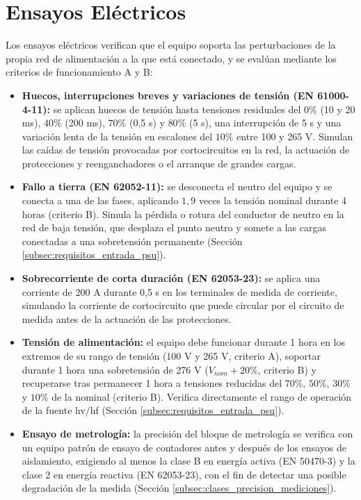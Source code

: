 \section{Ensayos Eléctricos}
\label{sec:ensayos_electricos}

Los ensayos eléctricos verifican que el equipo soporta las perturbaciones de la propia red de alimentación a la que está conectado, y se evalúan mediante los criterios de funcionamiento A y B:

\begin{itemize}
    \item \textbf{Huecos, interrupciones breves y variaciones de tensión (EN 61000-4-11):} se aplican huecos de tensión hasta tensiones residuales del $0\%$ (10 y 20 ms), $40\%$ (200 ms), $70\%$ (0,5 s) y $80\%$ (5 s), una interrupción de 5 s y una variación lenta de la tensión en escalones del $10\%$ entre 100 y 265 V. Simulan las caídas de tensión provocadas por cortocircuitos en la red, la actuación de protecciones y reenganchadores o el arranque de grandes cargas.
    \item \textbf{Fallo a tierra (EN 62052-11):} se desconecta el neutro del equipo y se conecta a una de las fases, aplicando $1,9$ veces la tensión nominal durante 4 horas (criterio B). Simula la pérdida o rotura del conductor de neutro en la red de baja tensión, que desplaza el punto neutro y somete a las cargas conectadas a una sobretensión permanente (Sección \ref{subsec:requisitos_entrada_psu}).
    \item \textbf{Sobrecorriente de corta duración (EN 62053-23):} se aplica una corriente de 200 A durante 0,5 s en los terminales de medida de corriente, simulando la corriente de cortocircuito que puede circular por el circuito de medida antes de la actuación de las protecciones.
    \item \textbf{Tensión de alimentación:} el equipo debe funcionar durante 1 hora en los extremos de su rango de tensión (100 V y 265 V, criterio A), soportar durante 1 hora una sobretensión de 276 V ($V_{nom} + 20\%$, criterio B) y recuperarse tras permanecer 1 hora a tensiones reducidas del $70\%$, $50\%$, $30\%$ y $10\%$ de la nominal (criterio B). Verifica directamente el rango de operación de la fuente \gls{hv}/\gls{hf} (Sección \ref{subsec:requisitos_entrada_psu}).
    \item \textbf{Ensayo de metrología:} la precisión del bloque de metrología se verifica con un equipo patrón de ensayo de contadores antes y después de los ensayos de aislamiento, exigiendo al menos la clase B en energía activa (EN 50470-3) y la clase 2 en energía reactiva (EN 62053-23), con el fin de detectar una posible degradación de la medida (Sección \ref{subsec:clases_precision_mediciones}).
\end{itemize}

